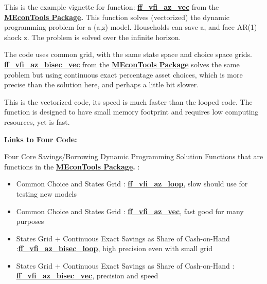 \documentclass[
]{book}
\begin{document}
This is the example vignette for function:
\href{https://github.com/FanWangEcon/MEconTools/blob/master/MEconTools/vfi/ff_vfi_az_vec.m}{\textbf{ff\_vfi\_az\_vec}}
from the \href{https://fanwangecon.github.io/MEconTools/}{\textbf{MEconTools
Package}}\textbf{.} This function
solves (vectorized) the dynamic programming problem for a (a,z) model.
Households can save a, and face AR(1) shock z. The problem is solved
over the infinite horizon.

The code uses common grid, with the same state space and choice space
grids.
\href{https://github.com/FanWangEcon/MEconTools/blob/master/MEconTools/vfi/ff_vfi_az_bisec_vec.m}{\textbf{ff\_vfi\_az\_bisec\_vec}}
from the \href{https://fanwangecon.github.io/MEconTools/}{\textbf{MEconTools
Package}} solves the same
problem but using continuous exact percentage asset choices, which is
more precise than the solution here, and perhaps a little bit slower.

This is the vectorized code, its speed is much faster than the looped
code. The function is designed to have small memory footprint and
requires low computing resources, yet is fast.

\textbf{Links to Four Code:}

Four Core Savings/Borrowing Dynamic Programming Solution Functions that
are functions in the \href{https://fanwangecon.github.io/MEconTools/}{\textbf{MEconTools
Package}}\textbf{.} :

\begin{itemize}
\item
  Common Choice and States Grid :
  \href{https://github.com/FanWangEcon/MEconTools/blob/master/MEconTools/vfi/ff_vfi_az_loop.m}{\textbf{ff\_vfi\_az\_loop}},
  slow should use for testing new models
\item
  Common Choice and States Grid :
  \href{https://github.com/FanWangEcon/MEconTools/blob/master/MEconTools/vfi/ff_vfi_az_vec.m}{\textbf{ff\_vfi\_az\_vec}},
  fast good for many purposes
\item
  States Grid + Continuous Exact Savings as Share of Cash-on-Hand :\href{https://github.com/FanWangEcon/MEconTools/blob/master/MEconTools/vfi/ff_vfi_az_bisec_loop.m}{\textbf{ff\_vfi\_az\_bisec\_loop}},
  high precision even with small grid
\item
  States Grid + Continuous Exact Savings as Share of Cash-on-Hand :
  \href{https://github.com/FanWangEcon/MEconTools/blob/master/MEconTools/vfi/ff_vfi_az_bisec_vec.m}{\textbf{ff\_vfi\_az\_bisec\_vec}},
  precision and speed
\end{itemize}
\end{document}
